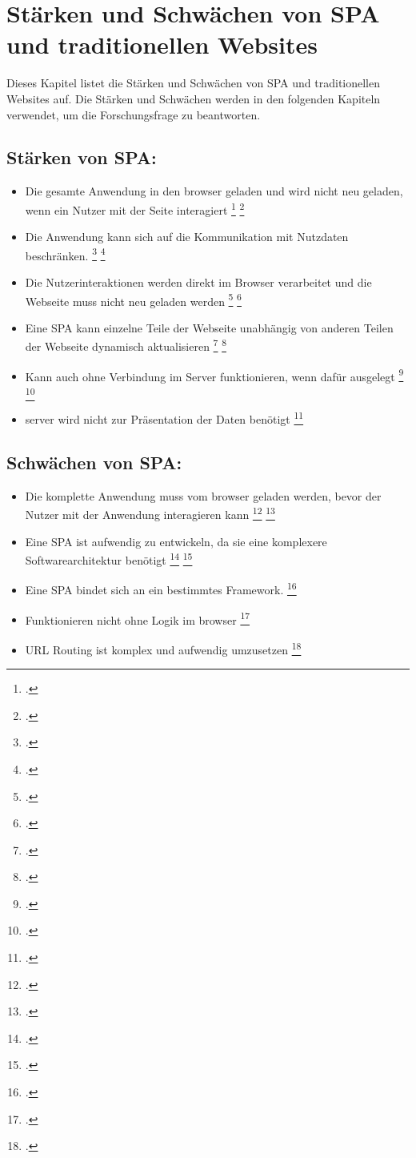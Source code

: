 \section{Stärken und Schwächen von \ac{SPA} und traditionellen Websites}
Dieses Kapitel listet die Stärken und Schwächen von \ac{SPA} und traditionellen Websites auf.
Die Stärken und Schwächen werden in den folgenden Kapiteln verwendet, um die Forschungsfrage zu beantworten.

\subsection{Stärken von \ac{SPA}:}
\begin{itemize}
    \item Die gesamte Anwendung in den \gls{browser} geladen und wird nicht neu geladen, wenn ein Nutzer mit der Seite interagiert \footcite[Vgl. ][Seite 3]{Smith2022} \footcite[Vgl.][Seite 7]{Flanagan2011}
    \item Die Anwendung kann sich auf die Kommunikation mit Nutzdaten beschränken. \footcite[Vgl. ][Seite 3]{Smith2022} \footcite[Vgl.][Seite 13]{Flanagan2011}
    \item Die Nutzerinteraktionen werden direkt im Browser verarbeitet und die Webseite muss nicht neu geladen werden \footcite[Vgl. ][Seite 3]{Smith2022} \footcite[Vgl.][Seite 12]{Flanagan2011}
    \item Eine \ac{SPA} kann einzelne Teile der Webseite unabhängig von anderen Teilen der Webseite dynamisch aktualisieren \footcite[Vgl. ][Seite 7]{Smith2022} \footcite[Vgl.][Seite 143]{Irudayaraj2019}
    \item Kann auch ohne Verbindung im Server funktionieren, wenn dafür ausgelegt \footcite[Vgl. ][Seite 7]{Smith2022} \footcite[Vgl.][Seite 235]{Gavrila2019}
    \item \gls{server} wird nicht zur Präsentation der Daten benötigt \footcite[Vgl. ][Seite 7]{Flanagan2011}
\end{itemize}


\subsection{Schwächen von \ac{SPA}:}

\begin{itemize}
    \item Die komplette Anwendung muss vom \gls{browser} geladen werden, bevor der Nutzer mit der Anwendung interagieren kann \footcite[Vgl. ][Seite 3]{Smith2022} \footcite[Vgl.][Seite 235]{Gavrila2019}
    \item Eine \ac{SPA} ist aufwendig zu entwickeln, da sie eine komplexere Softwarearchitektur benötigt \footcite[Vgl. ][Seite 4]{Smith2022} \footcite[Vgl.][Seite 15]{Flanagan2011}
    \item Eine \ac{SPA} bindet sich an ein bestimmtes Framework. \footcite[Vgl. ][Seite 4]{Smith2022}
    \item Funktionieren nicht ohne Logik im \gls{browser} \footcite[Vgl. ][Seite 7]{Smith2022}
    \item \ac{URL} Routing ist komplex und aufwendig umzusetzen \footcite[Vgl. ][Seite 7]{Smith2022}
\end{itemize}

